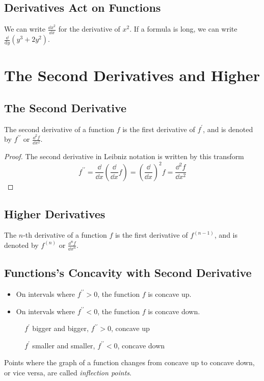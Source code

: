 \subsection{Derivatives Act on Functions}
We can write $\frac{\dd x^2}{\dd x}$ for the derivative of $x^2$. If a formula is long, we can write $\frac\dd{\mathrm{d}y}(y^3+2y^2)$.


\section{The Second Derivatives and Higher}
\subsection{The Second Derivative}
The second derivative of a function $f$ is the first derivative of $f^\prime$, and is denoted by $f^{\prime\prime}$ or $\frac{\dd^2 f}{\dd x^2}$.
\begin{proof}
  The second derivative in Leibniz notation is written by this transform
  \[
  f^{\prime\prime}
  =\frac\dd{\dd x}\left(\frac\dd{\dd x}f\right)
  =\left(\frac\dd{\dd x}\right)^2 f
  =\frac{\dd^2 f}{\dd x^2}
  \]
\end{proof}

\subsection{Higher Derivatives}
The $n$-th derivative of a function $f$ is the first derivative of $f^{(n-1)}$, and is denoted by $f^{(n)}$ or $\frac{\dd^n f}{\dd x^n}$.

\subsection{Functions's Concavity with Second Derivative}
\begin{itemize}
\item On intervals where $f^{\prime\prime}>0$, the function $f$ is concave up.
\item On intervals where $f^{\prime\prime}<0$, the function $f$ is concave down.
\end{itemize}
\begin{figure}[H]
  \centering
  \caption{$f^\prime$ bigger and bigger, $f^{\prime\prime}>0$, concave up}
\end{figure}
\begin{figure}[H]
  \centering
  \caption{$f^\prime$ smaller and smaller, $f^{\prime\prime}<0$, concave down}
\end{figure}
\begin{definition}
Points where the graph of a function changes from concave up to concave down, or vice versa, are called \textit{inflection points}.
\end{definition}

